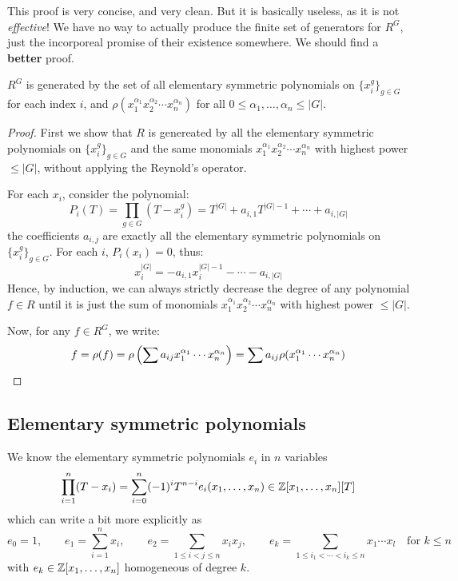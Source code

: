 \documentclass{article}
\begin{document}
This proof is very concise, and very clean. But it is basically useless, as it is not \textit{effective}! We have no way to actually produce the finite set of generators for $R^G$, just the incorporeal promise of their existence somewhere. We should find a \textbf{better} proof.

\begin{theorem}
    $R^G$ is generated by the set of all elementary symmetric polynomials on $\{x_i^g\}_{g\in G}$ for each index $i$, and $\rho(x_1^{\alpha_1}x_2^{\alpha_2}\cdots x_n^{\alpha_n})$ for all $0\leq \alpha_1,\ldots,\alpha_n \leq |G|$.

    \begin{proof}
        First we show that $R$ is genereated by all the elementary symmetric polynomials on $\{x_i^g\}_{g\in G}$ and the same monomials $x_1^{\alpha_1}x_2^{\alpha_2}\cdots x_n^{\alpha_n}$ with highest power $\leq |G|$, without applying the Reynold's operator.

        For each $x_i$, consider the polynomial: \[
        P_i(T) = \prod_{g\in G}(T-x_i^g) = T^{|G|} + a_{i,1}T^{|G|-1} + \cdots + a_{i,|G|}
        \] the coefficients $a_{i,j}$ are exactly all the elementary symmetric polynomials on $\{x_i^g\}_{g\in G}$. For each $i$, $P_i(x_i)=0$, thus: \[
        x_i^{|G|} = - a_{i,1}x_i^{|G|-1} - \cdots - a_{i,|G|}
        \] Hence, by induction, we can always strictly decrease the degree of any polynomial $f\in R$ until it is just the sum of monomials $x_1^{\alpha_1}x_2^{\alpha_2}\cdots x_n^{\alpha_n}$ with highest power $\leq |G|$.

        Now, for any $f\in R^G$, we write: \[
        f = \rho(f) = \rho\left( \sum a_{ij}x_1^{\alpha_1}\cdots x_n^{\alpha_n} \right) = \sum a_{ij}\rho(x_1^{\alpha_1}\cdots x_n^{\alpha_n})\qedhere
        \]
    \end{proof}
\end{theorem}

\subsection{Elementary symmetric polynomials}

We know the elementary symmetric polynomials $e_i$ in $n$ variables\[
\prod_{i=1}^n(T-x_i) = \sum_{i=0}^n(-1)^iT^{n-i}e_i(x_1,\ldots,x_n) \in \mathbb{Z}[x_1,\ldots,x_n][T]
\] which can write a bit more explicitly as \[
e_0 = 1, \qquad e_1 = \sum_{i=1}^nx_i, \qquad e_2 = \sum_{1\leq i < j \leq n}x_ix_j, \qquad e_k = \sum_{1\leq i_1 < \cdots < i_k \leq n} x_1\cdots x_l \quad \text{for $k\leq n$}
\] with $e_k\in \mathbb{Z}[x_1,\ldots, x_n]$ homogeneous of degree $k$.
\end{document}
